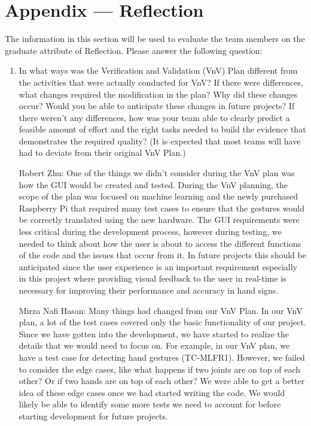 \documentclass[12pt, titlepage]{article}
\begin{document}
\newpage{}
\section*{Appendix --- Reflection}

The information in this section will be used to evaluate the team members on the
graduate attribute of Reflection.  Please answer the following question:

\begin{enumerate}
  \item In what ways was the Verification and Validation (VnV) Plan different
  from the activities that were actually conducted for VnV?  If there were
  differences, what changes required the modification in the plan?  Why did
  these changes occur?  Would you be able to anticipate these changes in future
  projects?  If there weren't any differences, how was your team able to clearly
  predict a feasible amount of effort and the right tasks needed to build the
  evidence that demonstrates the required quality?  (It is expected that most
  teams will have had to deviate from their original VnV Plan.)

  Robert Zhu: One of the things we didn’t consider during the VnV plan was how the 
  GUI would be created and tested. During the VnV planning, the scope of the plan was 
  focused on machine learning and the newly purchased Raspberry Pi that required many 
  test cases to ensure that the gestures would be correctly translated using the new 
  hardware. The GUI requirements were less critical during the development process, 
  however during testing, we needed to think about how the user is about to access 
  the different functions of the code and the issues that occur from it. In future 
  projects this should be anticipated since the user experience is an important 
  requirement especially in this project where providing visual feedback to the user 
  in real-time is necessary for improving their performance and accuracy in hand signs.
  
  Mirza Nafi Hasan: Many things had changed from our VnV Plan. In our VnV plan, a lot 
  of the test cases covered only the basic functionality of our project. Since we have 
  gotten into the development, we have started to realize the details that we would need 
  to focus on. For example, in our VnV plan, we have a test case for detecting hand 
  gestures (TC-MLFR1). However, we failed to consider the edge cases, like what happens
  if two joints are on top of each other? Or if two hands are on top of each other? We 
  were able to get a better idea of these edge cases once we had started writing the 
  code. We would likely be able to identify some more tests we need to account for 
  before starting development for future projects.
\end{enumerate}
\end{document}
